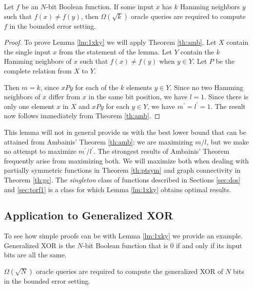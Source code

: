 \begin{lemma}
\label{lm:1xky}
Let $f$ be an $N$-bit Boolean function.  If some input $x$ has $k$
Hamming neighbors $y$ such that $f(x) \neq f(y)$, then
$\Omega(\sqrt{k})$ oracle queries are required to compute $f$ in the
bounded error setting.
\end{lemma}

\begin{proof}
To prove Lemma \ref{lm:1xky} we will apply Theorem \ref{th:amb}.  Let
$X$ contain the single input $x$ from the statement of the lemma.  Let
$Y$ contain the $k$ Hamming neighbors of $x$ such that $f(x)
\neq f(y)$ when $y \in Y$.  Let $P$ be the complete relation from $X$
to $Y$.

Then $m = k$, since $xPy$ for each of the $k$ elements $y \in Y$.
Since no two Hamming neighbors of $x$ differ from $x$ in the same bit
position, we have $l = 1$.  Since there is only one element $x$ in $X$
and $xPy$ for each $y \in Y$, we have $m^{\prime} = l^{\prime} = 1$.
The result now follows immediately from Theorem \ref{th:amb}.
\end{proof}

This lemma will not in general provide us with the best lower bound
that can be attained from Ambainis' Theorem \ref{th:amb}: we are
maximizing $m/l$, but we make no attempt to maximize
$m^{\prime}/l^{\prime}$.  The strongest results of Ambainis' Theorem
frequently arise from maximizing both.  We will maximize both when
dealing with partially symmetric functions in Theorem \ref{th:ptsym}
and graph connectivity in Theorem \ref{th:gc}.  The \emph{singleton}
class of functions described in Sections \ref{sec:dos} and
\ref{sec:torf1} is a class for which Lemma \ref{lm:1xky} obtains 
optimal results.

\subsection{Application to Generalized XOR} 
\label{sec:gXOR}

To see how simple proofs can be with Lemma \ref{lm:1xky} we provide an
example.  Generalized XOR is the $N$-bit Boolean function that is 0 if
and only if its input bits are all the same.

\begin{theorem}
\label{th:gXOR}
$\Omega(\sqrt{N})$ oracle queries are required to compute
the generalized XOR of $N$ bits in the bounded error setting.
\end{theorem}


